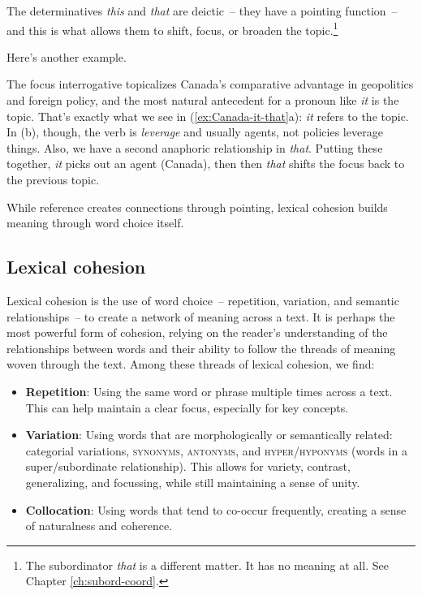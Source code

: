 The determinatives \textit{this} and \textit{that} are deictic~-- they have a pointing function~-- and this is what allows them to shift, focus, or broaden the topic.\footnote{The subordinator \textit{that} is a different matter. It has no meaning at all. See Chapter \ref{ch:subord-coord}.}

Here's another example.

\ea \label{ex:Canada-it-that}
    \z
\z

The focus interrogative topicalizes Canada's comparative advantage in geopolitics and foreign policy, and the most natural antecedent for a pronoun like \textit{it} is the topic. That's exactly what we see in  (\ref{ex:Canada-it-that}a): \textit{it} refers to the topic. In (b), though, the verb is \textit{leverage} and usually agents, not policies leverage things. Also, we have a second anaphoric relationship in \textit{that}. Putting these together, \textit{it} picks out an agent (Canada), then then \textit{that} shifts the focus back to the previous topic.


\bigskip

While reference creates connections through pointing, lexical cohesion builds meaning through word choice itself.

\subsection{Lexical cohesion}

Lexical cohesion is the use of word choice~-- repetition, variation, and semantic relationships~-- to create a network of meaning across a text. It is perhaps the most powerful form of cohesion, relying on the reader's understanding of the relationships between words and their ability to follow the threads of meaning woven through the text. Among these threads of lexical cohesion, we find:

\begin{itemize}[noitemsep]
    \item \textbf{Repetition}: Using the same word or phrase multiple times across a text. This can help maintain a clear focus, especially for key concepts.

    \item \textbf{Variation}: Using words that are morphologically or semantically related: categorial variations, \textsc{synonyms}, \textsc{antonyms}, and \textsc{hyper}/\textsc{hyponyms} (words in a super/subordinate relationship). This allows for variety, contrast, generalizing, and focussing, while still maintaining a sense of unity.
    
    \item \textbf{Collocation}: Using words that tend to co-occur frequently, creating a sense of naturalness and coherence.
\end{itemize}

